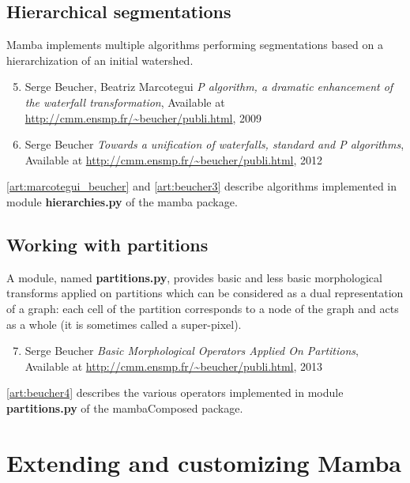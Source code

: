 \documentclass[a4paper,10pt,oneside]{article}
\begin{document}
\subsection{Hierarchical segmentations}
\label{cha:hierar_seg}

Mamba implements multiple algorithms performing segmentations based on
a hierarchization of an initial watershed.

\begin{enumerate}
\setcounter{enumi}{4}
\item \label{art:marcotegui_beucher} Serge Beucher, Beatriz Marcotegui
\emph{P algorithm, a dramatic enhancement of the waterfall transformation},
Available at \url{http://cmm.ensmp.fr/~beucher/publi.html}, 2009

\item \label{art:beucher3} Serge Beucher
\emph{Towards a unification of waterfalls, standard and P algorithms},
Available at \url{http://cmm.ensmp.fr/~beucher/publi.html}, 2012
\end{enumerate}

\ref{art:marcotegui_beucher} and \ref{art:beucher3} describe algorithms
implemented in module \textbf{hierarchies.py} of the mamba package.

\subsection{Working with partitions}
\label{cha:partitions}

A module, named \textbf{partitions.py}, provides basic and less basic
morphological transforms applied on partitions which can be considered as a dual representation
of a graph: each cell of the partition corresponds to a node of the graph and acts as a whole
(it is sometimes called a super-pixel).

\begin{enumerate}
\setcounter{enumi}{6}
\item \label{art:beucher4} Serge Beucher
\emph{Basic Morphological Operators Applied On Partitions},
Available at \url{http://cmm.ensmp.fr/~beucher/publi.html}, 2013
\end{enumerate}

\ref{art:beucher4} describes the various operators implemented in
module \textbf{partitions.py} of the mambaComposed package.

\pagebreak

\section{Extending and customizing Mamba}
\end{document}
